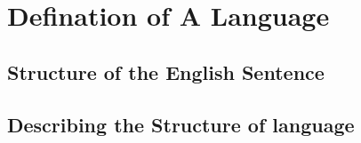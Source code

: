 \section{Defination of A Language}

\subsection{Structure of the English Sentence}

\subsection{Describing the Structure of language}


